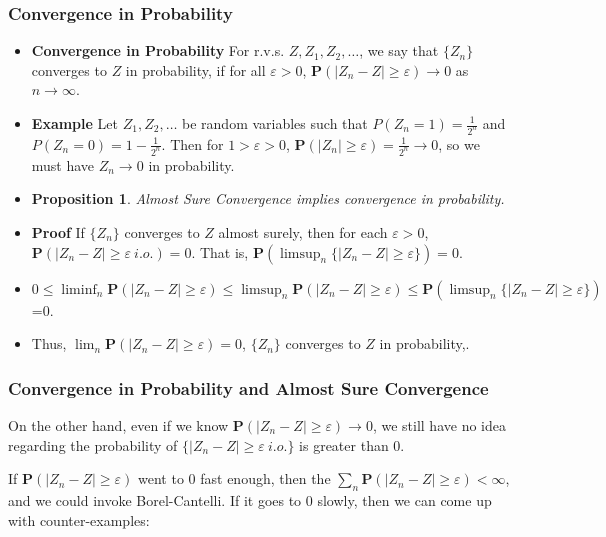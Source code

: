 \documentclass[handout]{beamer}
\newtheorem{Proposition}[theorem]{Proposition}%
\newcommand{\BP}{\mathbf{P}}
\begin{document}
\frame
{
  \frametitle{Convergence in Probability}

   \begin{itemize}
     \item<1-> \textbf{Convergence in Probability} For r.v.s. $Z, Z_1, Z_2, \ldots$, we say that $\{Z_n\}$ converges to $Z$ in probability, if for all $\varepsilon>0$, $\BP(|Z_n-Z|\geq \varepsilon) \rightarrow 0$ as $n\rightarrow \infty$. 
     
      
      \item<2-> \textbf{Example} Let $Z_1, Z_2, \ldots$ be random variables such that $P(Z_n=1)=\frac{1}{2^n}$ and $P(Z_n=0)=1-\frac{1}{2^n}$. Then for $1>\varepsilon>0$, $\BP(|Z_n|\geq \varepsilon)=\frac{1}{2^n}\rightarrow 0$, so we must have $Z_n\rightarrow 0$ in probability. 
      
   \item<3->[]     \begin{Proposition} Almost Sure Convergence implies convergence in probability.  \end{Proposition}       

  \item<4-> \textbf{Proof} If $\{Z_n\}$ converges to $Z$ almost surely, then for each $\varepsilon>0$, $\BP(|Z_n-Z| \geq \varepsilon \  i.o.)=0$. That is, $\BP(\limsup_n \{|Z_n-Z| \geq \varepsilon\})=0$.  
    
    \item<5->[-] $0\leq \liminf_n \BP(|Z_n-Z| \geq \varepsilon )\leq \limsup_n \BP(|Z_n-Z| \geq \varepsilon) \leq \BP(\limsup_n \{|Z_n-Z| \geq \varepsilon\})$=0. 
    
     \item<6->[-]  Thus, $\lim_n \BP(|Z_n-Z| \geq \varepsilon)=0$,  $\{Z_n\}$ converges to $Z$ in probability,.  
                                
\end{itemize}
}



\frame
{
  \frametitle{Convergence in Probability and Almost Sure Convergence}

	On the other hand, even if we know $\BP(|Z_n-Z| \geq \varepsilon) \to 0$, we still have no idea regarding the probability of $\{ |Z_n-Z| \geq \varepsilon \ i.o. \}$ is greater than 0. 
	\newline
		
	If $\BP(|Z_n-Z| \geq \varepsilon)$ went to $0$ fast enough, then the $\sum_n \BP(|Z_n-Z| \geq \varepsilon) < \infty$, and we could invoke Borel-Cantelli. If it goes to $0$ slowly, then we can come up with counter-examples:       

}
\end{document}
